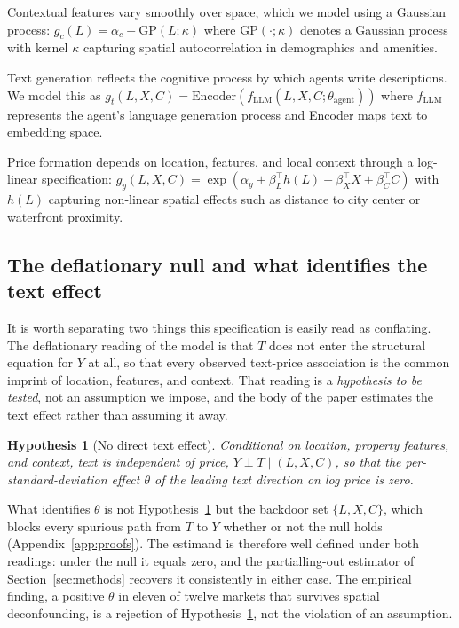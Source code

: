 \documentclass{article}
\newtheorem{hypothesis}{Hypothesis}
\begin{document}
Contextual features vary smoothly over space, which we model using a Gaussian process: $g_c(L) = \alpha_c + \text{GP}(L; \kappa)$ where $\text{GP}(\cdot; \kappa)$ denotes a Gaussian process with kernel $\kappa$ capturing spatial autocorrelation in demographics and amenities.

Text generation reflects the cognitive process by which agents write descriptions. We model this as $g_t(L, X, C) = \text{Encoder}\left(f_{\text{LLM}}(L, X, C; \theta_{\text{agent}})\right)$ where $f_{\text{LLM}}$ represents the agent's language generation process and Encoder maps text to embedding space.

Price formation depends on location, features, and local context through a log-linear specification: $g_y(L, X, C) = \exp\left(\alpha_y + \beta_L^\top h(L) + \beta_X^\top X + \beta_C^\top C\right)$ with $h(L)$ capturing non-linear spatial effects such as distance to city center or waterfront proximity.

\subsection{The deflationary null and what identifies the text effect}

It is worth separating two things this specification is easily read as conflating. The deflationary reading of the model is that $T$ does not enter the structural equation for $Y$ at all, so that every observed text-price association is the common imprint of location, features, and context. That reading is a \emph{hypothesis to be tested}, not an assumption we impose, and the body of the paper estimates the text effect rather than assuming it away.

\begin{hypothesis}[No direct text effect]
\label{hyp:null}
Conditional on location, property features, and context, text is independent of price, $Y \perp T \mid (L, X, C)$, so that the per-standard-deviation effect $\theta$ of the leading text direction on log price is zero.
\end{hypothesis}

What identifies $\theta$ is not Hypothesis~\ref{hyp:null} but the backdoor set $\{L, X, C\}$, which blocks every spurious path from $T$ to $Y$ whether or not the null holds (Appendix~\ref{app:proofs}). The estimand is therefore well defined under both readings: under the null it equals zero, and the partialling-out estimator of Section~\ref{sec:methods} recovers it consistently in either case. The empirical finding, a positive $\theta$ in eleven of twelve markets that survives spatial deconfounding, is a rejection of Hypothesis~\ref{hyp:null}, not the violation of an assumption.
\end{document}
